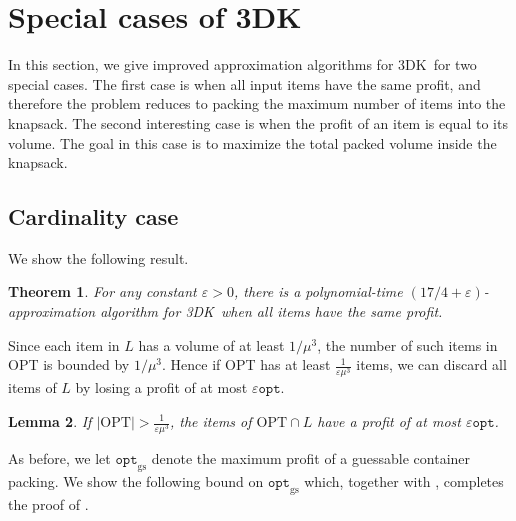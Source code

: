 \documentclass[10pt,a4paper]{amsart}
\newcommand{\eps}{\varepsilon}
\renewcommand{\epsilon}{\varepsilon} %
\newcommand{\tdk}{\textsc{3DK}}
\newtheorem{theorem}{Theorem}[section]
\newtheorem{lemma}[theorem]{Lemma}
\theoremstyle{definition}
\newcommand{\alg}{\mathtt{opt}_{\mathrm{gs}}}
\newcommand{\opt}{\mathtt{opt}}
\newcommand{\OPT}{\mathrm{OPT}}
\begin{document}
\section{Special cases of \tdk}
In this section, we give improved approximation algorithms for \tdk~for two special cases. The first case is when all input items have the same profit, and therefore the problem reduces to packing the maximum number of items into the knapsack. The second interesting case is when the profit of an item is equal to its volume. The goal in this case is to maximize the total packed volume inside the knapsack.

\subsection{Cardinality case}
\label{sec:nonrot-cardinality}
We show the following result.

\begin{theorem}
    \label{thm:3dkc}
   For any constant $\eps>0$, there is a polynomial-time $(17/4 +\eps)$-approximation algorithm for \tdk~when all items have the same profit. 
\end{theorem}

Since each item in $L$ has a volume of at least $1/\mu^3$, the number of such items in OPT is bounded by $1/\mu^3$. Hence if OPT has at least $\frac{1}{\epsilon\mu^3}$ items, we can discard all items of $L$ by losing a profit of at most $\epsilon \opt$.

\begin{lemma}
\label{lem:largedelete}
    If $|\OPT|> \frac{1}{\epsilon\mu^3}$, the items of $\OPT\cap L$ have a profit of at most $\epsilon \opt$. 
\end{lemma}


As before, we let $\alg$ denote the maximum profit of a guessable container packing. We show the following bound on $\alg$ which, together with , completes the proof of .
\end{document}
